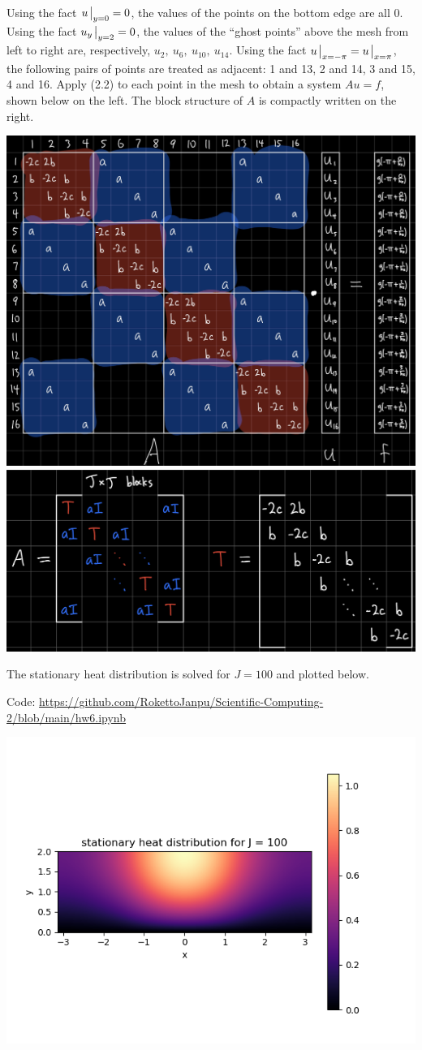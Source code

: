 \documentclass{article}
\begin{document}
Using the fact $u\eval_{y=0}=0$, the values of the points on the bottom edge are all 0. Using the fact $u_y\eval_{y=2}=0$, the values of the ``ghost points'' above the mesh from left to right are, respectively, $u_2,~u_6,~u_{10},~u_{14}$. Using the fact $u\eval_{x=-\pi}=u\eval_{x=\pi}$, the following pairs of points are treated as adjacent: 1 and 13, 2 and 14, 3 and 15, 4 and 16. Apply (2.2) to each point in the mesh to obtain a system $Au=f$, shown below on the left. The block structure of $A$ is compactly written on the right.

\includegraphics[scale=.1]{hw6 2 full}
\includegraphics[scale=.09]{hw6 2 block}

The stationary heat distribution is solved for $J=100$ and plotted below.

Code: \url{https://github.com/RokettoJanpu/Scientific-Computing-2/blob/main/hw6.ipynb}

\begin{center}
	\includegraphics[scale=1]{hw6 2 plot}
\end{center}
\end{document}
